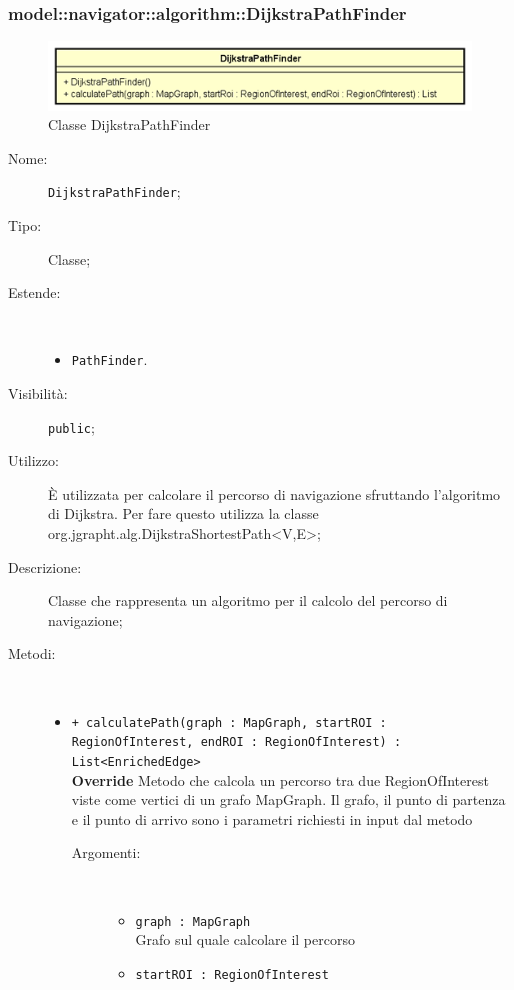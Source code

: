 \documentclass[../DefinizioneDiProdotto.tex]{subfiles}
\begin{document}
\subsubsection{model::navigator::algorithm::DijkstraPathFinder}

    \begin{figure}[H]
        \centering
        \includegraphics{img/DijkstraPathFinder.png}
        \caption{Classe DijkstraPathFinder}\label{fig:model::navigator::algorithm::DijkstraPathFinder} 
    \end{figure}
    \begin{description}
\item[Nome:] \texttt{DijkstraPathFinder};
\item[Tipo:] Classe;
\item[Estende:] \
\begin{itemize}
\item \texttt{PathFinder}.
\end{itemize}
\item[Visibilità:] \texttt{public};
\item[Utilizzo:] È utilizzata per calcolare il percorso di navigazione sfruttando l'algoritmo di Dijkstra. Per fare questo utilizza la classe org.jgrapht.alg.DijkstraShortestPath<V,E>;
\item[Descrizione:] Classe che rappresenta un algoritmo per il calcolo del percorso di navigazione;
\item[Metodi:] \
\begin{itemize}
\item \texttt{+ calculatePath(graph : MapGraph, startROI : RegionOfInterest, endROI : RegionOfInterest) : List<EnrichedEdge>}\\
\textbf{Override} Metodo che calcola un percorso tra due RegionOfInterest viste come vertici di un grafo MapGraph. Il grafo, il punto di partenza e il punto di arrivo sono i parametri richiesti in input dal metodo
 \begin{description}
\item[Argomenti:] \
\begin{itemize}
\item \texttt{graph : MapGraph}\\
Grafo sul quale calcolare il percorso\item \texttt{startROI : RegionOfInterest}\\

\end{itemize}
\end{description}
\end{itemize}
\end{description}
\end{document}
